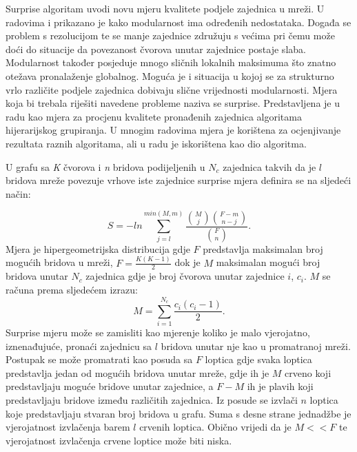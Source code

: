 \documentclass[times, utf8, diplomski]{fer}
\begin{document}
Surprise algoritam uvodi novu mjeru kvalitete podjele zajednica u mreži. U radovima \cite{blondel2008fast} i \cite{gamermann2022algorithm} prikazano je kako modularnost ima određenih nedostataka. Događa se problem s rezolucijom te se manje zajednice združuju s većima pri čemu može doći do situacije da povezanost čvorova unutar zajednice postaje slaba. Modularnost također posjeduje mnogo sličnih lokalnih maksimuma što znatno otežava pronalaženje globalnog. Moguća je i situacija u kojoj se za strukturno vrlo različite podjele zajednica dobivaju slične vrijednosti modularnosti. Mjera koja bi trebala riješiti navedene probleme naziva se surprise. Predstavljena je u radu \cite{aldecoa2010jerarca} kao mjera za procjenu kvalitete pronađenih zajednica algoritama hijerarijskog grupiranja. U mnogim radovima mjera je korištena za ocjenjivanje rezultata raznih algoritama, ali u radu \cite{gamermann2022algorithm} je iskorištena kao dio algoritma.


U grafu sa \textit{K} čvorova i \textit{n} bridova podijeljenih u $N_{c}$ zajednica takvih da je $l$ bridova mreže povezuje vrhove iste zajednice surprise mjera definira se na sljedeći način:

\begin{equation}
	S = - ln \sum_{j = l}^{min(M,m)} \frac{ {M \choose j} {F-m \choose n-j} }{ {F \choose n}}.
\end{equation}
Mjera je hipergeometrijska distribucija gdje $F$ predstavlja maksimalan broj mogućih bridova u mreži, $F = \frac{K(K-1)}{2}$ dok je $M$ maksimalan mogući broj bridova unutar $N_{c}$ zajednica gdje je broj čvorova unutar zajednice $i$, $c_{i}$. $M$ se računa prema sljedećem izrazu:
\begin{equation}
	M = \sum_{i=1}^{N_{c}} \frac{c_{i}(c_{i}-1)}{2}.
\end{equation} 
Surprise mjeru može se zamisliti kao mjerenje koliko je malo vjerojatno, iznenađujuće, pronaći zajednicu sa $l$ bridova unutar nje kao u promatranoj mreži. Postupak se može promatrati kao posuda sa $F$ loptica gdje svaka loptica predstavlja jedan od mogućih bridova unutar mreže, gdje ih je $M$ crveno koji predstavljaju moguće bridove unutar zajednice, a $F-M$ ih je plavih koji predstavljaju bridove između različitih zajednica. Iz posude se izvlači $n$ loptica koje predstavljaju stvaran broj bridova u grafu. Suma s desne strane jednadžbe je vjerojatnost izvlačenja barem $l$ crvenih loptica. Obično vrijedi da je $M << F$ te vjerojatnost izvlačenja crvene loptice može biti niska.
\end{document}
